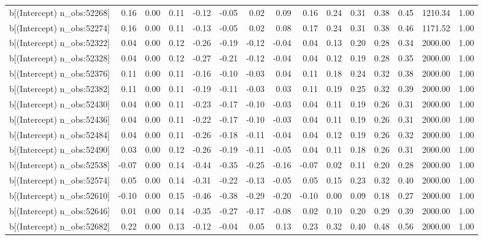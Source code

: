 \begin{table}[ht]
\begin{tabular}{rrrrrrrrrrrrrrr}
  b[(Intercept) n\_obs:52268] & 0.16 & 0.00 & 0.11 & -0.12 & -0.05 & 0.02 & 0.09 & 0.16 & 0.24 & 0.31 & 0.38 & 0.45 & 1210.34 & 1.00 \\ 
  b[(Intercept) n\_obs:52274] & 0.16 & 0.00 & 0.11 & -0.13 & -0.05 & 0.02 & 0.08 & 0.17 & 0.24 & 0.31 & 0.38 & 0.46 & 1171.52 & 1.00 \\ 
  b[(Intercept) n\_obs:52322] & 0.04 & 0.00 & 0.12 & -0.26 & -0.19 & -0.12 & -0.04 & 0.04 & 0.13 & 0.20 & 0.28 & 0.34 & 2000.00 & 1.00 \\ 
  b[(Intercept) n\_obs:52328] & 0.04 & 0.00 & 0.12 & -0.27 & -0.21 & -0.12 & -0.04 & 0.04 & 0.12 & 0.19 & 0.28 & 0.35 & 2000.00 & 1.00 \\ 
  b[(Intercept) n\_obs:52376] & 0.11 & 0.00 & 0.11 & -0.16 & -0.10 & -0.03 & 0.04 & 0.11 & 0.18 & 0.24 & 0.32 & 0.38 & 2000.00 & 1.00 \\ 
  b[(Intercept) n\_obs:52382] & 0.11 & 0.00 & 0.11 & -0.19 & -0.11 & -0.03 & 0.03 & 0.11 & 0.19 & 0.25 & 0.32 & 0.39 & 2000.00 & 1.00 \\ 
  b[(Intercept) n\_obs:52430] & 0.04 & 0.00 & 0.11 & -0.23 & -0.17 & -0.10 & -0.03 & 0.04 & 0.11 & 0.19 & 0.26 & 0.31 & 2000.00 & 1.00 \\ 
  b[(Intercept) n\_obs:52436] & 0.04 & 0.00 & 0.11 & -0.22 & -0.17 & -0.10 & -0.03 & 0.04 & 0.11 & 0.19 & 0.26 & 0.31 & 2000.00 & 1.00 \\ 
  b[(Intercept) n\_obs:52484] & 0.04 & 0.00 & 0.11 & -0.26 & -0.18 & -0.11 & -0.04 & 0.04 & 0.12 & 0.19 & 0.26 & 0.32 & 2000.00 & 1.00 \\ 
  b[(Intercept) n\_obs:52490] & 0.03 & 0.00 & 0.12 & -0.26 & -0.19 & -0.11 & -0.05 & 0.04 & 0.11 & 0.18 & 0.26 & 0.31 & 2000.00 & 1.00 \\ 
  b[(Intercept) n\_obs:52538] & -0.07 & 0.00 & 0.14 & -0.44 & -0.35 & -0.25 & -0.16 & -0.07 & 0.02 & 0.11 & 0.20 & 0.28 & 2000.00 & 1.00 \\ 
  b[(Intercept) n\_obs:52574] & 0.05 & 0.00 & 0.14 & -0.31 & -0.22 & -0.13 & -0.05 & 0.05 & 0.15 & 0.23 & 0.32 & 0.40 & 2000.00 & 1.00 \\ 
  b[(Intercept) n\_obs:52610] & -0.10 & 0.00 & 0.15 & -0.46 & -0.38 & -0.29 & -0.20 & -0.10 & 0.00 & 0.09 & 0.18 & 0.27 & 2000.00 & 1.00 \\ 
  b[(Intercept) n\_obs:52646] & 0.01 & 0.00 & 0.14 & -0.35 & -0.27 & -0.17 & -0.08 & 0.02 & 0.10 & 0.20 & 0.29 & 0.39 & 2000.00 & 1.00 \\ 
  b[(Intercept) n\_obs:52682] & 0.22 & 0.00 & 0.13 & -0.12 & -0.04 & 0.05 & 0.13 & 0.23 & 0.32 & 0.40 & 0.48 & 0.56 & 2000.00 & 1.00 \\ 

\end{tabular}
\end{table}
